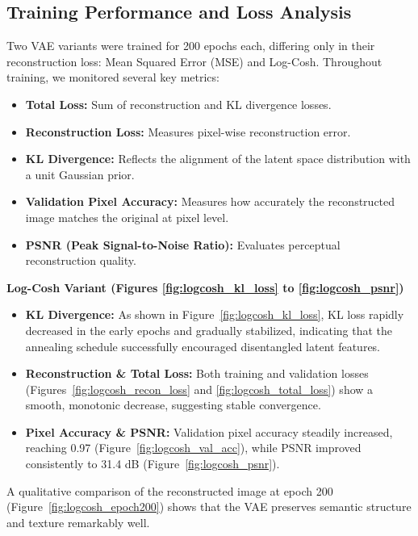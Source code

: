 \subsection{Training Performance and Loss Analysis} \label{subsubsec:vae_training_loss}

Two VAE variants were trained for 200 epochs each, differing only in their reconstruction loss: Mean Squared Error (MSE) and Log-Cosh. Throughout training, we monitored several key metrics:

\begin{itemize}
    \item \textbf{Total Loss:} Sum of reconstruction and KL divergence losses.
    \item \textbf{Reconstruction Loss:} Measures pixel-wise reconstruction error.
    \item \textbf{KL Divergence:} Reflects the alignment of the latent space distribution with a unit Gaussian prior.
    \item \textbf{Validation Pixel Accuracy:} Measures how accurately the reconstructed image matches the original at pixel level.
    \item \textbf{PSNR (Peak Signal-to-Noise Ratio):} Evaluates perceptual reconstruction quality.
\end{itemize}

\textbf{Log-Cosh Variant (Figures \ref{fig:logcosh_kl_loss} to \ref{fig:logcosh_psnr})}

\begin{itemize}
    \item \textbf{KL Divergence:} As shown in Figure~\ref{fig:logcosh_kl_loss}, KL loss rapidly decreased in the early epochs and gradually stabilized, indicating that the annealing schedule successfully encouraged disentangled latent features.
    \item \textbf{Reconstruction \& Total Loss:} Both training and validation losses (Figures~\ref{fig:logcosh_recon_loss} and \ref{fig:logcosh_total_loss}) show a smooth, monotonic decrease, suggesting stable convergence.
    \item \textbf{Pixel Accuracy \& PSNR:} Validation pixel accuracy steadily increased, reaching 0.97 (Figure~\ref{fig:logcosh_val_acc}), while PSNR improved consistently to 31.4 dB (Figure~\ref{fig:logcosh_psnr}).
\end{itemize}

A qualitative comparison of the reconstructed image at epoch 200 (Figure~\ref{fig:logcosh_epoch200}) shows that the VAE preserves semantic structure and texture remarkably well.

